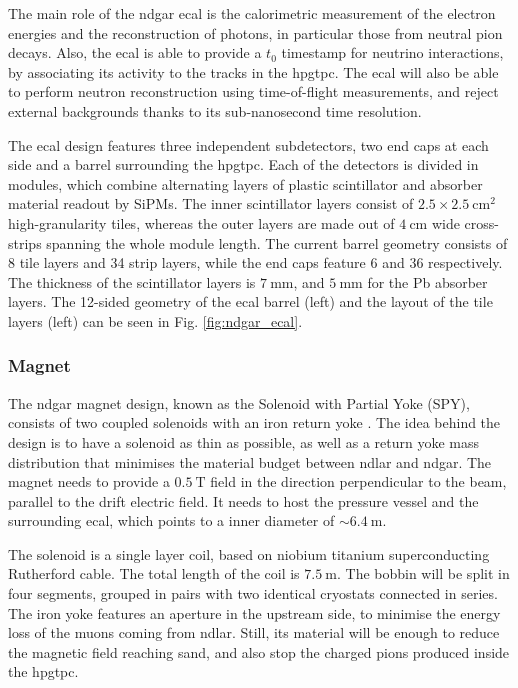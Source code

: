 The main role of the \gls{ndgar} \gls{ecal} is the calorimetric measurement of the electron energies and the reconstruction of photons, in particular those from neutral pion decays. Also, the \gls{ecal} is able to provide a $t_{0}$ timestamp for neutrino interactions, by associating its activity to the tracks in the \gls{hpgtpc}. The \gls{ecal} will also be able to perform neutron reconstruction using time-of-flight measurements, and reject external backgrounds thanks to its sub-nanosecond time resolution.

The \gls{ecal} design features three independent subdetectors, two end caps at each side and a barrel surrounding the \gls{hpgtpc}. Each of the detectors is divided in modules, which combine alternating layers of plastic scintillator and absorber material readout by SiPMs. The inner scintillator layers consist of $2.5\times2.5~\mathrm{cm}^{2}$ high-granularity tiles, whereas the outer layers are made out of $4~\mathrm{cm}$ wide cross-strips spanning the whole module length. The current barrel geometry consists of 8 tile layers and 34 strip layers, while the end caps feature 6 and 36 respectively. The thickness of the scintillator layers is $7~\mathrm{mm}$, and $5~\mathrm{mm}$ for the Pb absorber layers. The 12-sided geometry of the \gls{ecal} barrel (left) and the layout of the tile layers (left) can be seen in Fig. \ref{fig:ndgar_ecal}.

\subsubsection{Magnet}

The \gls{ndgar} magnet design, known as the Solenoid with Partial Yoke (SPY), consists of two coupled solenoids with an iron return yoke \cite{DUNESPY2023}. The idea behind the design is to have a solenoid as thin as possible, as well as a return yoke mass distribution that minimises the material budget between \gls{ndlar} and \gls{ndgar}. The magnet needs to provide a $0.5~\mathrm{T}$ field in the direction perpendicular to the beam, parallel to the drift electric field. It needs to host the pressure vessel and the surrounding \gls{ecal}, which points to a inner diameter of $\sim6.4~\mathrm{m}$.

The solenoid is a single layer coil, based on niobium titanium superconducting Rutherford cable. The total length of the coil is $7.5~\mathrm{m}$. The bobbin will be split in four segments, grouped in pairs with two identical cryostats connected in series. The iron yoke features an aperture in the upstream side, to minimise the energy loss of the muons coming from \gls{ndlar}. Still, its material will be enough to reduce the magnetic field reaching \gls{sand}, and also stop the charged pions produced inside the \gls{hpgtpc}.


